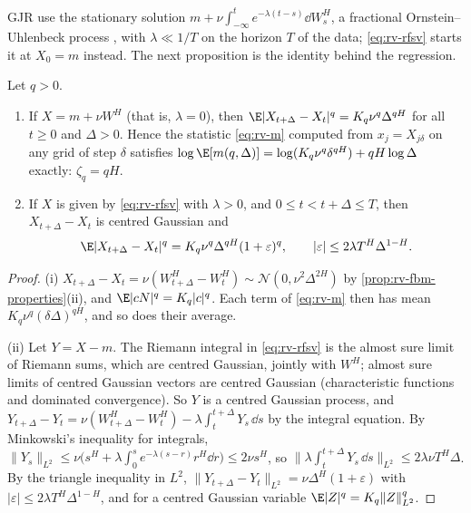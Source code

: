 GJR use the stationary solution $m+\nu\int_{-\infty}^te^{-\lambda(t-s)}\dd W^H_s$, a fractional
Ornstein--Uhlenbeck process \citep{cheridito-kawaguchi-maejima-2003}, with $\lambda\ll1/T$ on the horizon $T$
of the data; \eqref{eq:rv-rfsv} starts it at $X_0=m$ instead. The next proposition is the identity behind
the regression.

\begin{proposition}\label{prop:rv-scaling}
Let $q>0$.
\begin{enumerate}[label=(\roman*)]
  \item If $X=m+\nu W^H$ (that is, $\lambda=0$), then $\E|X_{t+\Delta}-X_t|^q=K_q\nu^q\Delta^{qH}$ for all
    $t\ge0$ and $\Delta>0$. Hence the statistic \eqref{eq:rv-m} computed from $x_j=X_{j\delta}$ on any grid of step
    $\delta$ satisfies $\log\E[m(q,\Delta)]=\log(K_q\nu^q\delta^{qH})+qH\log\Delta$ exactly: $\zeta_q=qH$.
  \item If $X$ is given by \eqref{eq:rv-rfsv} with $\lambda>0$, and $0\le t<t+\Delta\le T$, then
    $X_{t+\Delta}-X_t$ is centred Gaussian and
    \begin{equation}\label{eq:rv-scaling-error}
      \E|X_{t+\Delta}-X_t|^q=K_q\nu^q\Delta^{qH}(1+\varepsilon)^q,\qquad|\varepsilon|\le2\lambda T^H\Delta^{1-H}.
    \end{equation}
\end{enumerate}
\end{proposition}

\begin{proof}
(i) $X_{t+\Delta}-X_t=\nu(W^H_{t+\Delta}-W^H_t)\sim\mathcal N(0,\nu^2\Delta^{2H})$ by
\cref{prop:rv-fbm-properties}(ii), and $\E|cN|^q=K_q|c|^q$. Each term of \eqref{eq:rv-m} then has mean
$K_q\nu^q(\delta\Delta)^{qH}$, and so does their average.

(ii) Let $Y=X-m$. The Riemann integral in \eqref{eq:rv-rfsv} is the almost sure limit of Riemann sums, which are
centred Gaussian, jointly with $W^H$; almost sure limits of centred Gaussian vectors are centred Gaussian (characteristic
functions and dominated convergence). So $Y$ is a centred Gaussian process, and
$Y_{t+\Delta}-Y_t=\nu(W^H_{t+\Delta}-W^H_t)-\lambda\int_t^{t+\Delta}Y_s\,\dd s$ by the integral equation. By Minkowski's
inequality for integrals, $\|Y_s\|_{L^2}\le\nu\big(s^H+\lambda\int_0^se^{-\lambda(s-r)}r^H\dd r\big)\le2\nu s^H$, so
$\big\|\lambda\int_t^{t+\Delta}Y_s\,\dd s\big\|_{L^2}\le2\lambda\nu T^H\Delta$. By the triangle inequality in $L^2$,
$\|Y_{t+\Delta}-Y_t\|_{L^2}=\nu\Delta^H(1+\varepsilon)$ with $|\varepsilon|\le2\lambda T^H\Delta^{1-H}$, and for a centred
Gaussian variable $\E|Z|^q=K_q\|Z\|_{L^2}^q$.
\end{proof}

